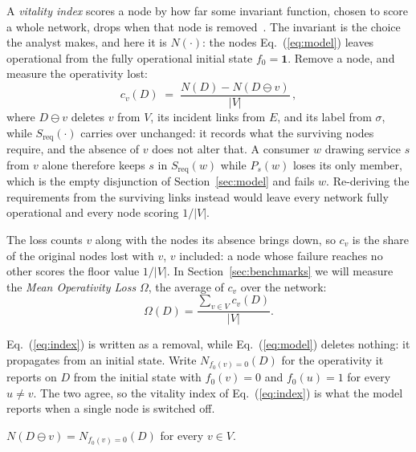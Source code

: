 \documentclass{svproc}
\begin{document}
A \emph{vitality index} scores a node by how far some invariant function, chosen to
score a whole network, drops when that node is
removed~\cite{koschutzki_centrality_2005,skibski_vitality_2021}. The invariant is
the choice the analyst makes, and here it is $N(\cdot)$: the nodes
Eq.~(\ref{eq:model}) leaves operational from the fully operational initial state
$f_0 = \mathbf{1}$. Remove a node, and measure the operativity lost:
\begin{equation}
c_v(D) \;=\; \frac{N(D) - N(D \ominus v)}{|V|} \,,
\label{eq:index}
\end{equation}
where $D \ominus v$ deletes $v$ from $V$, its incident links from $E$, and its
label from $\sigma$, while $S_{\mathrm{req}}(\cdot)$ carries over unchanged: it records what
the surviving nodes require, and the absence of $v$ does not alter that. A consumer
$w$ drawing service $s$ from $v$ alone therefore keeps $s$ in $S_{\mathrm{req}}(w)$
while $P_s(w)$ loses its only member, which is the empty disjunction of
Section~\ref{sec:model} and fails $w$. Re-deriving the requirements from the
surviving links instead would leave every network fully operational and every node
scoring $1/|V|$.

The loss counts $v$ along with the nodes its absence brings down, so $c_v$ is the
share of the original nodes lost with $v$, $v$ included: a node whose failure
reaches no other scores the floor value $1/|V|$. In Section~\ref{sec:benchmarks} we will measure
the \emph{Mean Operativity Loss} $\Omega$, the average of $c_v$ over the network:
\begin{equation}
  \Omega(D) = \frac{\sum_{v \in V} c_v(D)}{|V|}.
\end{equation}

Eq.~(\ref{eq:index}) is written as a removal, while Eq.~(\ref{eq:model}) deletes
nothing: it propagates from an initial state. Write $N_{f_0(v)=0}(D)$ for the
operativity it reports on $D$ from the initial state with $f_0(v) = 0$ and
$f_0(u) = 1$ for every $u \neq v$. The two agree, so the vitality index of
Eq.~(\ref{eq:index}) is what the model reports when a single node is switched off.

\begin{proposition}
\label{prop:conditioning}
$N(D \ominus v) = N_{f_0(v)=0}(D)$ for every $v \in V$.
\end{proposition}
\end{document}
